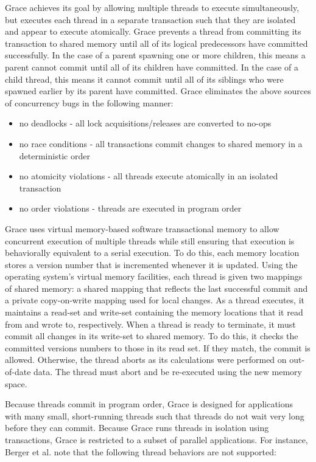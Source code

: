 Grace achieves its goal by allowing multiple threads to execute
simultaneously, but executes each thread in a separate transaction
such that they are isolated and appear to execute atomically.  Grace
prevents a thread from committing its transaction to shared memory
until all of its logical predecessors have committed successfully.  In
the case of a parent spawning one or more children, this means a
parent cannot commit until all of its children have committed.  In the
case of a child thread, this means it cannot commit until all of its
siblings who were spawned earlier by its parent have committed.  Grace
eliminates the above sources of concurrency bugs in the following
manner:

\begin{itemize}
\item no deadlocks - all lock acquisitions/releases are converted to
  no-ops

\item no race conditions - all transactions commit changes to shared
  memory in a deterministic order

\item no atomicity violations - all threads execute atomically in an
  isolated transaction

\item no order violations - threads are executed in program order
\end{itemize}

Grace uses virtual memory-based software transactional memory to allow
concurrent execution of multiple threads while still ensuring that
execution is behaviorally equivalent to a serial execution.  To do
this, each memory location stores a version number that is incremented
whenever it is updated.  Using the operating system's virtual memory
facilities, each thread is given two mappings of shared memory: a
shared mapping that reflects the last successful commit and a private
copy-on-write mapping used for local changes.  As a thread executes,
it maintains a read-set and write-set containing the memory locations
that it read from and wrote to, respectively.  When a thread is ready
to terminate, it must commit all changes in its write-set to shared
memory.  To do this, it checks the committed versions numbers to those
in its read set.  If they match, the commit is allowed.  Otherwise,
the thread aborts as its calculations were performed on out-of-date
data.  The thread must abort and be re-executed using the new memory
space.

Because threads commit in program order, Grace is designed for
applications with many small, short-running threads such that threads
do not wait very long before they can commit. Because Grace runs
threads in isolation using transactions, Grace is restricted to a
subset of parallel applications.  For instance, Berger et
al. \cite{grace} note that the following thread behaviors are not
supported:

